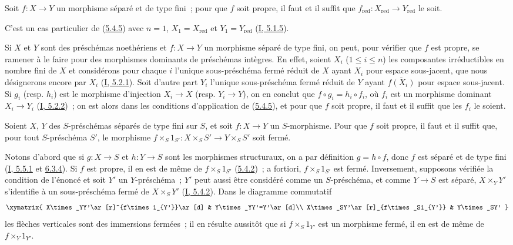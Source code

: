 \begin{corollary}[5.4.6]
\label{II.5.4.6-fr}
Soit $f:X\to Y$ un morphisme séparé et de type fini~; pour que $f$ soit
propre, il faut et il suffit que
$f_{\mathrm{red}}:X_{\mathrm{red}}\to Y_{\mathrm{red}}$ le soit.
\end{corollary}

C'est un cas particulier de (\hyperref[II.5.4.5-fr]{5.4.5}) avec $n=1$,
$X_1=X_{\mathrm{red}}$ et $Y_1=Y_{\mathrm{red}}$
(\hyperref[I.5.1.5-fr]{I, 5.1.5}).

\begin{env}[5.4.7]
\label{II.5.4.7-fr}
Si $X$ et $Y$ sont des préschémas noethériens et $f:X\to Y$ un morphisme
séparé de type fini, on peut, pour vérifier que $f$ est propre, se ramener à
le faire pour des morphismes dominants de préschémas intègres. En effet,
soient $X_i$ ($1\leq i\leq n$) les composantes irréductibles en nombre fini
de $X$ et considérons pour chaque $i$ l'unique sous-préschéma fermé réduit de
$X$ ayant $X_i$ pour espace sous-jacent, que nous désignerons encore par
$X_i$ (\hyperref[I.5.2.1-fr]{I, 5.2.1}). Soit d'autre part $Y_i$ l'unique
sous-préschéma fermé réduit de $Y$ ayant $\overline{f(X_i)}$ pour espace
sous-jacent. Si $g_i$ (resp. $h_i$) est le morphisme d'injection $X_i\to X$
(resp. $Y_i\to Y$), on en conclut que $f\circ g_i=h_i\circ f_i$, où $f_i$
est un morphisme dominant $X_i\to Y_i$
(\hyperref[I.5.2.2-fr]{I, 5.2.2})~; on est alors dans les conditions
d'application de (\hyperref[II.5.4.5-fr]{5.4.5}), et pour que $f$ soit
propre, il faut et il suffit que les $f_i$ le soient.
\end{env}

\begin{corollary}[5.4.8]
\label{II.5.4.8-fr}
Soient $X$, $Y$ des $S$-préschémas séparés de type fini sur $S$, et soit
$f:X\to Y$ un $S$-morphisme. Pour que $f$ soit propre, il faut et il suffit
que, pour tout $S$-préschéma $S'$, le morphisme
$f\times_S1_{S'}:X\times_SS'\to Y\times_SS'$ soit fermé.
\end{corollary}

Notons d'abord que si $g:X\to S$ et $h:Y\to S$ sont les morphismes
structuraux, on a par définition $g=h\circ f$, donc $f$ est séparé et de
type fini (\hyperref[I.5.5.1-fr]{I, 5.5.1} et
\hyperref[I.6.3.4-fr]{6.3.4}). Si $f$ est propre, il en est de même de
$f\times_S1_{S'}$ (\hyperref[II.5.4.2-fr]{5.4.2})~; a fortiori,
$f\times_S1_{S'}$ est fermé. Inversement, supposons vérifiée la condition de
l'énoncé et soit $Y'$ un $Y$-préschéma~; $Y'$ peut aussi être considéré
comme un $S$-préschéma, et comme $Y\to S$ est séparé, $X\times_YY'$
s'identifie à un sous-préschéma fermé de $X\times_SY'$
(\hyperref[I.5.4.2-fr]{I, 5.4.2}). Dans le diagramme commutatif
\[
  \xymatrix{
    X\times_YY'\ar[r]^{f\times1_{Y'}}\ar[d] &
    Y\times_YY'=Y'\ar[d]\\
    X\times_SY'\ar[r]_{f\times_S1_{Y'}} & Y\times_SY'
  }
\]
les flèches verticales sont des immersions fermées~; il en résulte aussitôt
que si $f\times_S1_{Y'}$ est un morphisme fermé, il en est de même de
$f\times_Y1_{Y'}$.

